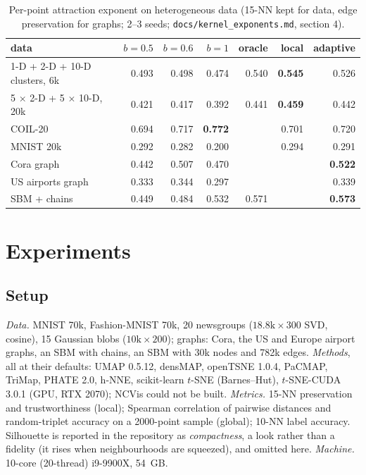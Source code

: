 \documentclass[11pt]{article}
\begin{document}
\begin{table}[t]
\centering\small
\caption{Per-point attraction exponent on heterogeneous data (15-NN kept for data, edge preservation for
graphs; 2--3 seeds; \texttt{docs/kernel\_exponents.md}, section 4).}
\label{tab:adaptive}
\begin{tabular}{lrrrrrr}
\toprule
data & $b=0.5$ & $b=0.6$ & $b=1$ & oracle & local & adaptive \\
\midrule
1-D + 2-D + 10-D clusters, 6k & 0.493 & 0.498 & 0.474 & 0.540 & \textbf{0.545} & 0.526 \\
5 $\times$ 2-D + 5 $\times$ 10-D, 20k & 0.421 & 0.417 & 0.392 & 0.441 & \textbf{0.459} & 0.442 \\
COIL-20 & 0.694 & 0.717 & \textbf{0.772} & & 0.701 & 0.720 \\
MNIST 20k & 0.292 & 0.282 & 0.200 & & 0.294 & 0.291 \\
Cora graph & 0.442 & 0.507 & 0.470 & & & \textbf{0.522} \\
US airports graph & 0.333 & 0.344 & 0.297 & & & 0.339 \\
SBM + chains & 0.449 & 0.484 & 0.532 & 0.571 & & \textbf{0.573} \\
\bottomrule
\end{tabular}
\end{table}

\section{Experiments}\label{sec:exp}
\subsection{Setup}
\emph{Data.} MNIST 70k, Fashion-MNIST 70k, 20 newsgroups ($18.8\mathrm{k} \times 300$ SVD, cosine), 15
Gaussian blobs ($10\mathrm{k} \times 200$); graphs: Cora, the US and Europe airport graphs, an SBM with
chains, an SBM with 30k nodes and 782k edges. \emph{Methods}, all at their defaults: UMAP 0.5.12,
densMAP, openTSNE 1.0.4, PaCMAP, TriMap, PHATE 2.0, h-NNE, scikit-learn $t$-SNE (Barnes--Hut),
$t$-SNE-CUDA 3.0.1 (GPU, RTX 2070); NCVis could not be built. \emph{Metrics.} 15-NN preservation and
trustworthiness (local); Spearman correlation of pairwise distances and random-triplet accuracy on a
2000-point sample (global); 10-NN label accuracy. Silhouette is reported in the repository as
\emph{compactness}, a look rather than a fidelity (it rises when neighbourhoods are squeezed), and
omitted here. \emph{Machine.} 10-core (20-thread) i9-9900X, 54~GB.
\end{document}
